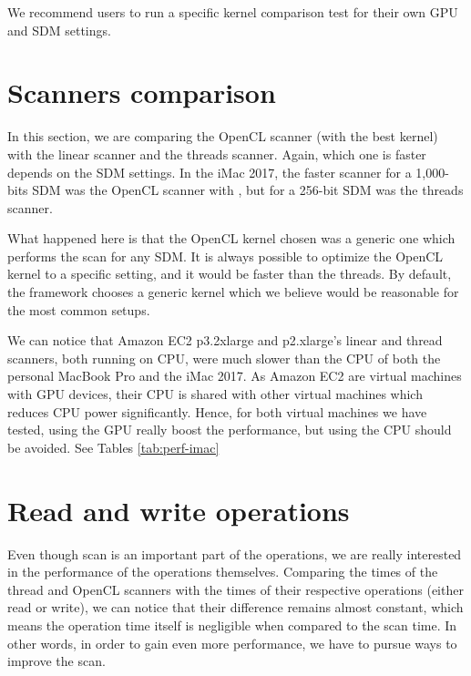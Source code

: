 We recommend users to run a specific kernel comparison test for their own GPU and SDM settings.


\section{Scanners comparison}

In this section, we are comparing the OpenCL scanner (with the best kernel) with the linear scanner and the threads scanner. Again, which one is faster depends on the SDM settings. In the iMac 2017, the faster scanner for a 1,000-bits SDM was the OpenCL scanner with , but for a 256-bit SDM was the threads scanner.

What happened here is that the OpenCL kernel chosen was a generic one which performs the scan for any SDM. It is always possible to optimize the OpenCL kernel to a specific setting, and it would be faster than the threads. By default, the framework chooses a generic kernel which we believe would be reasonable for the most common setups.

We can notice that Amazon EC2 p3.2xlarge and p2.xlarge's linear and thread scanners, both running on CPU, were much slower than the CPU of both the personal MacBook Pro and the iMac 2017. As Amazon EC2 are virtual machines with GPU devices, their CPU is shared with other virtual machines which reduces CPU power significantly. Hence, for both virtual machines we have tested, using the GPU really boost the performance, but using the CPU should be avoided. See Tables \ref{tab:perf-imac}

\section{Read and write operations}

Even though scan is an important part of the operations, we are really interested in the performance of the operations themselves. Comparing the times of the thread and OpenCL scanners with the times of their respective operations (either read or write), we can notice that their difference remains almost constant, which means the operation time itself is negligible when compared to the scan time. In other words, in order to gain even more performance, we have to pursue ways to improve the scan.


